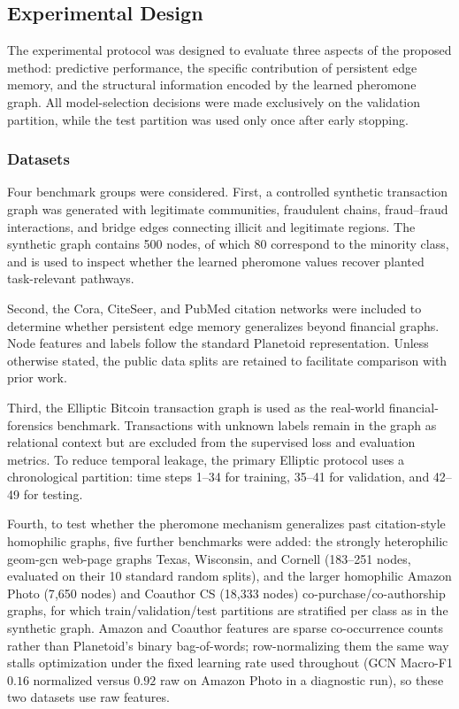 \subsection{Experimental Design}

The experimental protocol was designed to evaluate three aspects of the proposed method: predictive performance, the specific contribution of persistent edge memory, and the structural information encoded by the learned pheromone graph. All model-selection decisions were made exclusively on the validation partition, while the test partition was used only once after early stopping.

\subsubsection{Datasets}

Four benchmark groups were considered. First, a controlled synthetic transaction graph was generated with legitimate communities, fraudulent chains, fraud--fraud interactions, and bridge edges connecting illicit and legitimate regions. The synthetic graph contains 500 nodes, of which 80 correspond to the minority class, and is used to inspect whether the learned pheromone values recover planted task-relevant pathways.

Second, the Cora, CiteSeer, and PubMed citation networks were included to determine whether persistent edge memory generalizes beyond financial graphs. Node features and labels follow the standard Planetoid representation. Unless otherwise stated, the public data splits are retained to facilitate comparison with prior work.

Third, the Elliptic Bitcoin transaction graph is used as the real-world financial-forensics benchmark. Transactions with unknown labels remain in the graph as relational context but are excluded from the supervised loss and evaluation metrics. To reduce temporal leakage, the primary Elliptic protocol uses a chronological partition: time steps 1--34 for training, 35--41 for validation, and 42--49 for testing.

Fourth, to test whether the pheromone mechanism generalizes past citation-style homophilic graphs, five further benchmarks were added: the strongly heterophilic geom-gcn web-page graphs Texas, Wisconsin, and Cornell (183--251 nodes, evaluated on their 10 standard random splits), and the larger homophilic Amazon Photo (7{,}650 nodes) and Coauthor CS (18{,}333 nodes) co-purchase/co-authorship graphs, for which train/validation/test partitions are stratified per class as in the synthetic graph. Amazon and Coauthor features are sparse co-occurrence counts rather than Planetoid's binary bag-of-words; row-normalizing them the same way stalls optimization under the fixed learning rate used throughout (GCN Macro-F1 $0.16$ normalized versus $0.92$ raw on Amazon Photo in a diagnostic run), so these two datasets use raw features.

